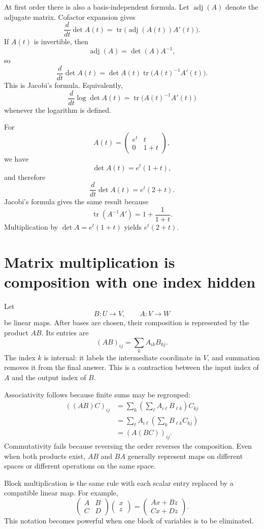 At first order there is also a basis-independent formula.  Let \(\operatorname{adj}(A)\) denote the adjugate matrix.  Cofactor expansion gives
\[
  \frac{d}{dt}\det A(t)
  =\operatorname{tr}\bigl(\operatorname{adj}(A(t))A'(t)\bigr).
\]
If \(A(t)\) is invertible, then
\[
  \operatorname{adj}(A)=\det(A)A^{-1},
\]
so
\[
  \boxed{
  \frac{d}{dt}\det A(t)
  =\det A(t)\operatorname{tr}\bigl(A(t)^{-1}A'(t)\bigr).}
\]
This is Jacobi's formula.  Equivalently,
\[
  \frac{d}{dt}\log\det A(t)
  =\operatorname{tr}\bigl(A(t)^{-1}A'(t)\bigr)
\]
whenever the logarithm is defined.

For
\[
  A(t)=
  \begin{pmatrix}
    e^t&t\\
    0&1+t
  \end{pmatrix},
\]
we have
\[
  \det A(t)=e^t(1+t),
\]
and therefore
\[
  \frac{d}{dt}\det A(t)=e^t(2+t).
\]
Jacobi's formula gives the same result because
\[
  \operatorname{tr}(A^{-1}A')=1+\frac1{1+t}.
\]
Multiplication by \(\det A=e^t(1+t)\) yields \(e^t(2+t)\).

\section{Matrix multiplication is composition with one index hidden}

Let
\[
  B:U\to V,
  \qquad
  A:V\to W
\]
be linear maps.  After bases are chosen, their composition is represented by the product \(AB\).  Its entries are
\[
  (AB)_{ij}=\sum_k A_{ik}B_{kj}.
\]
The index \(k\) is internal: it labels the intermediate coordinate in \(V\), and summation removes it from the final answer.  This is a contraction between the input index of \(A\) and the output index of \(B\).

Associativity follows because finite sums may be regrouped:
\[
\begin{aligned}
((AB)C)_{ij}
&=\sum_{k}\left(\sum_{\ell}A_{i\ell}B_{\ell k}\right)C_{kj}\\
&=\sum_{\ell}A_{i\ell}\left(\sum_k B_{\ell k}C_{kj}\right)\\
&=(A(BC))_{ij}.
\end{aligned}
\]
Commutativity fails because reversing the order reverses the composition.  Even when both products exist, \(AB\) and \(BA\) generally represent maps on different spaces or different operations on the same space.

Block multiplication is the same rule with each scalar entry replaced by a compatible linear map.  For example,
\[
\begin{pmatrix}A&B\\C&D\end{pmatrix}
\begin{pmatrix}x\\z\end{pmatrix}
=
\begin{pmatrix}Ax+Bz\\Cx+Dz\end{pmatrix}.
\]
This notation becomes powerful when one block of variables is to be eliminated.

